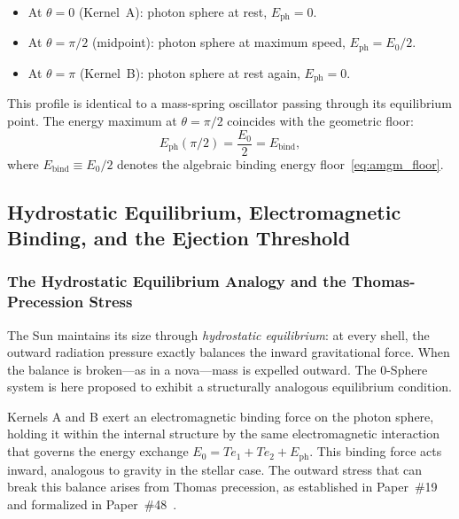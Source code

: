 \documentclass[%
 reprint, amsmath,amssymb, aps, prb, ]{revtex4-2}
\numberwithin{equation}{section}
\newcommand{\iphase}{\theta}
\begin{document}
\begin{itemize}
\item At $\iphase = 0$ (Kernel~A): photon sphere at rest, $E_{\text{ph}} = 0$.
\item At $\iphase = \pi/2$ (midpoint): photon sphere at maximum speed, $E_{\text{ph}} = E_0/2$.
\item At $\iphase = \pi$ (Kernel~B): photon sphere at rest again, $E_{\text{ph}} = 0$.
\end{itemize}

This profile is identical to a mass-spring oscillator passing through its equilibrium point. The energy maximum at $\iphase = \pi/2$ coincides with the geometric floor:
\begin{equation}
E_{\text{ph}}(\pi/2) = \frac{E_0}{2} = E_{\text{bind}},
\label{eq:Eph_midpoint}
\end{equation}
where $E_{\text{bind}} \equiv E_0/2$ denotes the algebraic binding energy floor~\eqref{eq:amgm_floor}.

\subsection{Hydrostatic Equilibrium, Electromagnetic Binding, and the Ejection Threshold}
\label{sec:ejection_threshold}

\subsubsection{The Hydrostatic Equilibrium Analogy and the Thomas-Precession Stress}
\label{sec:ejection_thomas}

The Sun maintains its size through \emph{hydrostatic equilibrium}: at every shell, the outward radiation pressure exactly balances the inward gravitational force. When the balance is broken---as in a nova---mass is expelled outward. The 0-Sphere system is here proposed to exhibit a structurally analogous equilibrium condition.

Kernels A and B exert an electromagnetic binding force on the photon sphere, holding it within the internal structure by the same electromagnetic interaction that governs the energy exchange $E_0 = Te_1 + Te_2 + E_{\text{ph}}$. This binding force acts inward, analogous to gravity in the stellar case. The outward stress that can break this balance arises from Thomas precession, as established in Paper~\#19~\cite{hanamura19} and formalized in Paper~\#48~\cite{hanamura48}.
\end{document}

